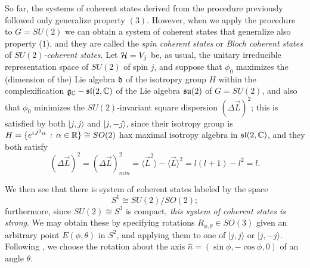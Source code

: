 




So far, the systems of coherent states derived from the procedure previously followed only generalize property $(3)$. However, when we apply the procedure to $G = SU(2)$ we can obtain a system of coherent states that generalize also property ($1$), and they are called the \emph{spin coherent states} or \emph{Bloch coherent states} of \emph{$SU(2)$-coherent states}. Let $\mathcal H = V_j$ be, as usual, the unitary irreducible representation space of $SU(2)$ of spin $j$, and suppose that $\phi_0$ maximizes the (dimension of the) Lie algebra $\mathfrak{h}$ of the isotropry group $H$ within the complexification $\mathfrak{g}_{\mathbb{C}} - \mathfrak{sl}(2, \mathbb{C})$ of the Lie algebra $\mathfrak{su}(2)$ of $G = SU(2)$, and also that $\phi_0$ minimizes the $SU(2)$-invariant square dispersion $(\Delta \vec L)^2$; this is satisfied by both $|j, j\rangle$ and $|j, -j\rangle$, since their isotropy group is $H = \{e^{iJ^3 \alpha} \, : \, \alpha \in \mathbb{R}\} \cong SO(2)$ hax maximal isotropy algebra in $\mathfrak{sl}(2, \mathbb{C})$, and they both satisfy 
\begin{equation}
    (\Delta \vec L)^2 = (\Delta \vec L)^2_{min} = \langle \vec L^2 \rangle - \langle \vec L \rangle ^2 = l(l+1) - l^2 = l.
\end{equation}

We then see that there is system of coherent states labeled by the space
\begin{equation}
    S^1 \cong SU(2) / SO(2);
\end{equation}
furthermore, since $SU(2) \cong S^3$ is compact, \textit{this system of coherent states is strong}. We may obtain these by specifying rotations $R_{\phi, \theta} \in SO(3)$ given an arbitrary point $E(\phi, \theta)$ in $S^2$, and applying them to one of $|j, j \rangle$ or $|j, -j\rangle$. Following \cite{Arecchi}, we choose the rotation about the axis $\hat n = (\sin \phi, -\cos \phi, 0)$ of an angle $\theta$.

